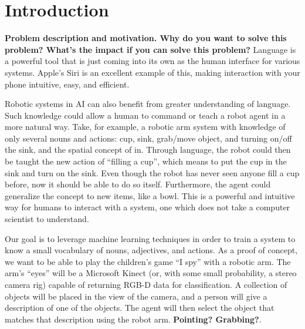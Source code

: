 \documentclass[11pt]{article}
\title{\xxx{Linguistic Classification of Objects}}
\author{Rob Goeddel \and Lauren Hinkle \and James Kirk \and Aaron Mininger}
\date{}
\newcommand{\xxx}[1]{{\bf \color{red} #1}}
\newcommand{\meh}[1]{{\bf \color{blue} #1}}
\begin{document}
\maketitle

\begin{abstract}
\xxx{Abstract goes here, 1 par. max}
Interaction between robots and humans is a rapidly growing area of reasearch.  Inorder for a robot to effectively interact with a human, it needs to be able to understand human descriptions of objects within its environment.  In a simple ``I Spy'' game the basic concepts of learning features of objects can be demonstrated in an interactive way between two parties. \xxx{moar}
Dijkstra was a cool guy and it's fun to cite his papers~\cite{dijkstra1959}. (It's true)
\end{abstract}

\section{Introduction}
\xxx{Problem description and motivation. Why do you want to solve this
    problem? What's the impact if you can solve this problem?}
Language is a powerful tool that is just coming into its own as the human
interface for various systems. Apple's Siri is an excellent example of this,
making interaction with your phone intuitive, easy, and efficient. 

Robotic systems in AI can also benefit from greater understanding of
language. Such knowledge could allow a human to command or teach a robot agent in a more natural way. Take, for example, a robotic arm system with knowledge of only
several nouns and actions: cup, sink, grab/move object, and turning on/off
the sink, and the spatial concept of in. Through language, the robot could then be taught the new action of ``filling a cup'', which means to put the cup in the sink and turn on the
sink. Even though the robot has never seen anyone fill a cup before, now
it should be able to do so itself. Furthermore, the agent could generalize the concept to new items, like a bowl. This is a powerful
and intuitive way for humans to interact with a system, one which does not
take a computer scientist to understand.

Our goal is to leverage machine learning techniques in order to train a system to know a small vocabulary of nouns, adjectives,
and actions. As a proof of concept, we want to be able to play the children's
game ``I spy'' with a robotic arm. The arm's ``eyes'' will be a Microsoft
Kinect (or, with some small probability, a stereo camera rig) capable of
returning RGB-D data for classification. A collection of objects will be placed in the view of the camera, and a person will give a description of one of the objects. The agent will then select the object that matches that description using the robot arm. \meh{Pointing? Grabbing?}.
\end{document}

